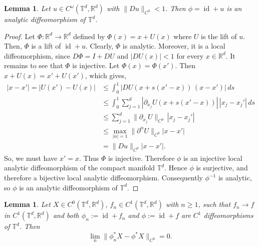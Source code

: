 \documentclass[12pt,reqno,a4paper]{amsart}%
\numberwithin{equation}{section}
\newtheorem{lemma}[theorem]{Lemma}
\newcommand{\Rr}{{\mathbb{R}}}
\newcommand{\Tt}{{\mathbb{T}}}
\newcommand{\id}  {\operatorname{id}}
\begin{document}
\begin{lemma}\label{lemma:diffeo}
Let $u\in C^{\omega}(\Tt^d,\Rr^d)$ with $\|Du\|_{C^0}<1$. 
Then $\phi=\id+u$ is an analytic diffeomorphism of $\Tt^d$.
\end{lemma}

\begin{proof}
Let $\Phi\colon \Rr^d\to\Rr^d$ defined by $\Phi(x)=x+U(x)$ where $U$ is the lift of $u$.  Then, $\Phi$ is a lift of $\id+u$.  Clearly,  $\Phi$ is analytic.  Moreover,  it is a local diffeomorphism, since $D\Phi=I+DU$ and $|DU(x)|<1$ for every $x\in\Rr^d$.   
It remains to see that $\Phi$ is injective.  Let $\Phi(x)=\Phi(x')$.  Then $x+U(x)=x'+U(x')$,  which gives, 
\begin{align*}
|x-x'|=|U(x')-U(x)|&\leq \int_0^1|DU(x+s(x'-x))\, (x-x')|\,ds \\
&\leq
\int_0^1 \sum_{j=1}^d|\partial_{x_j}U(x+s(x'-x))| \,|x_j-x_j'|\,ds\\
&\leq
\sum_{j=1}^d \| \partial_{x_j}U \|_{C^0} \,|x_j-x_j'| \\
&\leq
\max_{|\alpha|=1}\|\partial^\alpha U\|_{C^0}
|x-x'|\\
&=
\|Du\|_{C^0}|x-x'|.
\end{align*}
So, we must have $x'=x$.   Thus $\Phi$ is injective.  Therefore $\phi$ is an injective local analytic diffeomorphism of the compact manifold $\Tt^d$.  Hence $\phi$ is surjective, and therefore a bijective local analytic diffeomorphism.  Consequently $\phi^{-1}$
 is analytic,  so $\phi$ is an analytic diffeomorphism of $\Tt^d$.
\end{proof}


\begin{lemma}\label{lem:continuity of push-forward}
Let $X \in C^0(\Tt^d,\Rr^d)$,  $f_n\in C^1(\Tt^d,\Rr^d)$ with $n\geq1$, such that $f_n\to f$ in $C^1(\Tt^d,\Rr^d)$ and both $\phi_n := \id+f_n$ and $\phi := \id+f$ are $C^1$ diffeomorphisms of $\mathbb{T}^d$.
Then
\[
\lim_n \|\phi_n^*X- \phi^*X\|_{C^0}=0.
\]
\end{lemma}
\end{document}

